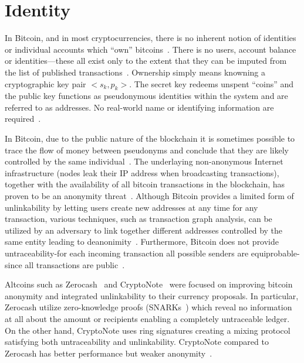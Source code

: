 \section{Identity}\label{blockchain:identity}

In Bitcoin, and in most cryptocurrencies, there is no inherent notion of identities or individual accounts which “own” bitcoins~\cite{7163021,nakamoto2012bitcoin}.
There is no users, account balance or identities—these all exist only to the extent that they can be imputed from the list of published transactions~\cite{7163021,nakamoto2012bitcoin}.
Ownership simply means knowning a cryptographic key pair $<s_k, p_k>$. The secret key redeems unspent “coins” and the public key functions as pseudonymous
identities within the system and are referred to as addresses. No real-world name or identifying information are required~\cite{7163021,nakamoto2012bitcoin}.

In Bitcoin, due to the public nature of the blockchain it is sometimes possible to trace the flow of money between pseudonyms and conclude that they are likely controlled by the same
individual~\cite{7163021}. The underlaying non-anonymous Internet infrastructure (nodes leak their IP address when broadcasting transactions),
together with the availability of all bitcoin transactions in the blockchain, has proven to be an anonymity threat~\cite{10.1007/978-3-319-17016-9_1, 7163021,Meiklejohn:2013:FBC:2504730.2504747,6113303,10.1007/978-3-642-39884-1_2,fi5020237}.
Although Bitcoin provides a limited form of unlinkability by letting users create new addresses at any time for any
transaction, various techniques, such as transaction graph analysis, can be utilized by an adversary to link together different addresses controlled
by the same entity leading to deanonimity~\cite{7163021,Meiklejohn:2013:FBC:2504730.2504747,6113303,10.1007/978-3-642-39884-1_2,fi5020237}.
Furthermore, Bitcoin does not provide untraceability-for each incoming transaction all possible senders are equiprobable-since all transactions are public~\cite{cryptonote}.

Altcoins such as Zerocash~\cite{zcash} and CryptoNote~\cite{cryptonote} were focused on improving bitcoin anonymity and integrated unlinkability to their currency proposals.
In particular, Zerocash utilize zero-knowledge proofs (SNARKs~\cite{10.1007/978-3-642-40084-1_6}) which reveal no information at all about the amount or recipients enabling a completely untraceable ledger.
On the other hand, CryptoNote uses ring signatures creating a mixing protocol satisfying both untraceability and unlinkability. CryptoNote compared to Zerocash has better performance but weaker anonymity~\cite{7163021}.


